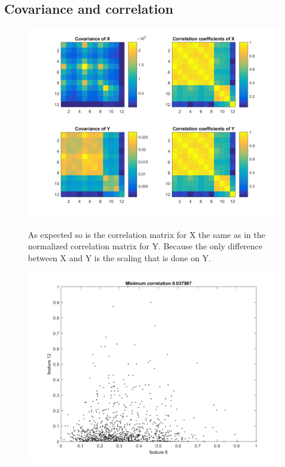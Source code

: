 \documentclass[a4paper,11pt]{article}
\begin{document}
\subsection{Covariance and correlation}
\begin{figure}[h]
  \begin{center}
    \includegraphics[width=\textwidth]{P2_2a}
    \caption{}
    \label{fig:P2_2a}
  \end{center}
As expected so is the correlation matrix for X the same as in the normalized correlation matrix for Y. Because the only difference between X and Y is the scaling that is done on Y.
\end{figure}
\begin{figure}[h]
  \begin{center}
    \includegraphics[width=\textwidth]{P2_2b}
    \caption{}
    \label{fig:P2_2b}
  \end{center}
\end{figure}
\end{document}

